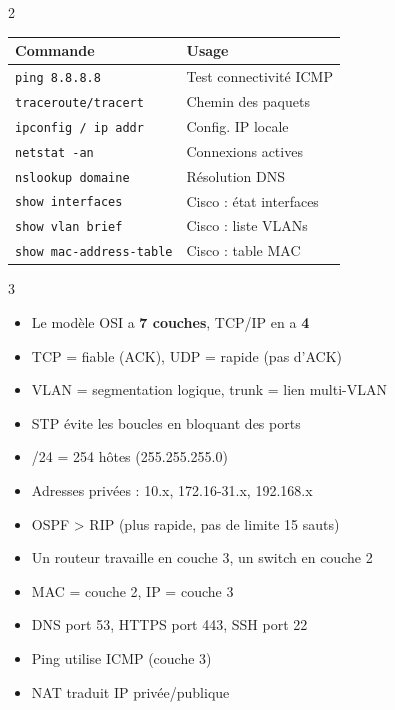 \documentclass[a4paper,10pt]{article}
\begin{document}
\begin{multicols}{2}
\begin{tcolorbox}[basebox, colframe=teal, title=12. Commandes de diagnostic réseau]
{\footnotesize
\begin{tabularx}{\columnwidth}{@{}lX@{}}
\toprule
\textbf{Commande} & \textbf{Usage} \\
\midrule
\texttt{ping 8.8.8.8}          & Test connectivité ICMP \\
\texttt{traceroute/tracert}     & Chemin des paquets \\
\texttt{ipconfig / ip addr}     & Config. IP locale \\
\texttt{netstat -an}            & Connexions actives \\
\texttt{nslookup domaine}       & Résolution DNS \\
\texttt{show interfaces}        & Cisco : état interfaces \\
\texttt{show vlan brief}        & Cisco : liste VLANs \\
\texttt{show mac-address-table} & Cisco : table MAC \\
\bottomrule
\end{tabularx}}
\end{tcolorbox}

\end{multicols}

\vspace{4pt}
\begin{tcolorbox}[basebox, colframe=crimson, title=Points clés à retenir pour l'examen]
\begin{multicols}{3}
\begin{itemize}
  \item Le modèle OSI a \textbf{7 couches}, TCP/IP en a \textbf{4}
  \item TCP = fiable (ACK), UDP = rapide (pas d'ACK)
  \item VLAN = segmentation logique, trunk = lien multi-VLAN
  \item STP évite les boucles en bloquant des ports
  \item /24 = 254 hôtes (255.255.255.0)
  \item Adresses privées : 10.x, 172.16-31.x, 192.168.x
  \item OSPF > RIP (plus rapide, pas de limite 15 sauts)
  \item Un routeur travaille en couche 3, un switch en couche 2
  \item MAC = couche 2, IP = couche 3
  \item DNS port 53, HTTPS port 443, SSH port 22
  \item Ping utilise ICMP (couche 3)
  \item NAT traduit IP privée/publique
\end{itemize}
\end{multicols}
\end{tcolorbox}
\end{document}

